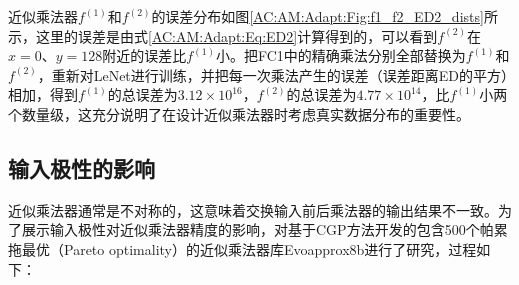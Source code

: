 近似乘法器$f^{(1)}$和$f^{(2)}$的误差分布如图\ref{AC:AM:Adapt:Fig:f1_f2_ED2_dists}所示，这里的误差是由式\eqref{AC:AM:Adapt:Eq:ED2}计算得到的，可以看到$f^{(2)}$在$x=0$、$y=128$附近的误差比$f^{(1)}$小。把FC1中的精确乘法分别全部替换为$f^{(1)}$和$f^{(2)}$，重新对LeNet进行训练，并把每一次乘法产生的误差（误差距离ED的平方）相加，得到$f^{(1)}$的总误差为$3.12 \times 10^{16}$，$f^{(2)}$的总误差为$4.77 \times 10^{14}$，比$f^{(1)}$小两个数量级，这充分说明了在设计近似乘法器时考虑真实数据分布的重要性。

\subsection{输入极性的影响}

近似乘法器通常是不对称的，这意味着交换输入前后乘法器的输出结果不一致。为了展示输入极性对近似乘法器精度的影响，对基于CGP方法开发的包含500个帕累拖最优（Pareto optimality）的近似乘法器库Evoapprox8b\cite{AC:AM:CGP_Evoapprox8b}进行了研究，过程如下：

